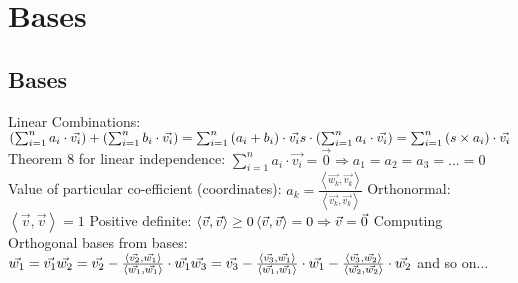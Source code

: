 \documentclass[12pt]{article}
\begin{document}
\section{Bases}
\subsection{Bases}
Linear Combinations:\newline\newline
\begin{math}\left (\sum_{i=1}^{n}a_{i}\cdot\vec{v_{i}}  \right )+\left (\sum_{i=1}^{n}b_{i}\cdot\vec{v_{i}}  \right )=\sum_{i=1}^{n}\left ( a_{i}+b_{i} \right )\cdot\vec{v_{i}}\newline\newline
s\cdot \left ( \sum_{i=1}^{n}a_{i}\cdot \vec{v_{i}} \right )=\sum_{i=1}^{n}\left ( s\times a_{i} \right )\cdot\vec{v_{i}}\end{math}\newline\newline
Theorem 8 for linear independence:\newline
\begin{math}
\sum_{i=1}^{n}a_{i}\cdot\vec{v_{i}}=\vec{0}\Rightarrow a_{1}=a_{2}=a_{3}=...=0
\end{math}\newline\newline
Value of particular co-efficient (coordinates):\newline
\begin{math}
a_{k}=\frac{\left \langle \vec{w_{k}},\vec{v_{k}} \right \rangle}{\left \langle \vec{v_{k}},\vec{v_{k}} \right \rangle}
\end{math}\newline\newline
Orthonormal: \begin{math}\left \langle \vec{v},\vec{v} \right \rangle=1\end{math}\newline\newline
Positive definite:\newline
\begin{math}
\left \langle \vec{v},\vec{v} \right \rangle\geq 0\newline
\left \langle \vec{v},\vec{v} \right \rangle=0\Rightarrow \vec{v}=\vec{0}
\end{math}\newline\newline
Computing Orthogonal bases from bases:\newline
\begin{math}
\vec{w_{1}}=\vec{v_{1}}\newline
\vec{w_{2}}=\vec{v_{2}}-\frac{\left \langle \vec{v_{2}},\vec{w_{1}} \right \rangle}{\left \langle \vec{w_{1}},\vec{w_{1}} \right \rangle}\cdot\vec{w_{1}}\newline
\vec{w_{3}}=\vec{v_{3}}-\frac{\left \langle \vec{v_{3}},\vec{w_{1}} \right \rangle}{\left \langle \vec{w_{1}},\vec{w_{1}} \right \rangle}\cdot\vec{w_{1}}-\frac{\left \langle \vec{v_{3}},\vec{w_{2}} \right \rangle}{\left \langle \vec{w_{2}},\vec{w_{2}} \right \rangle}\cdot\vec{w_{2}}
\end{math}\newline\newline
and so on...
\end{document}

